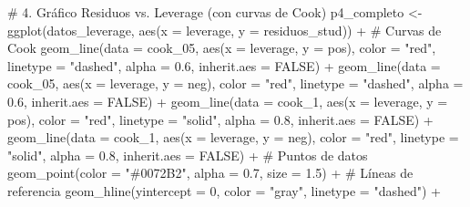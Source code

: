 \documentclass[
  letterpaper,
  DIV=11,
  numbers=noendperiod]{scrreprt}
\newenvironment{Shaded}{\begin{snugshade}}{\end{snugshade}}
\newcommand{\AttributeTok}[1]{\textcolor[rgb]{0.40,0.45,0.13}{#1}}
\newcommand{\CommentTok}[1]{\textcolor[rgb]{0.37,0.37,0.37}{#1}}
\newcommand{\ConstantTok}[1]{\textcolor[rgb]{0.56,0.35,0.01}{#1}}
\newcommand{\DecValTok}[1]{\textcolor[rgb]{0.68,0.00,0.00}{#1}}
\newcommand{\FloatTok}[1]{\textcolor[rgb]{0.68,0.00,0.00}{#1}}
\newcommand{\FunctionTok}[1]{\textcolor[rgb]{0.28,0.35,0.67}{#1}}
\newcommand{\NormalTok}[1]{\textcolor[rgb]{0.00,0.23,0.31}{#1}}
\newcommand{\OtherTok}[1]{\textcolor[rgb]{0.00,0.23,0.31}{#1}}
\newcommand{\SpecialCharTok}[1]{\textcolor[rgb]{0.37,0.37,0.37}{#1}}
\newcommand{\StringTok}[1]{\textcolor[rgb]{0.13,0.47,0.30}{#1}}
\begin{document}
\begin{tcolorbox}
\begin{Shaded}
\begin{Highlighting}[]
\CommentTok{\# 4. Gráfico Residuos vs. Leverage (con curvas de Cook)}
\NormalTok{p4\_completo }\OtherTok{\textless{}{-}} \FunctionTok{ggplot}\NormalTok{(datos\_leverage, }\FunctionTok{aes}\NormalTok{(}\AttributeTok{x =}\NormalTok{ leverage, }\AttributeTok{y =}\NormalTok{ residuos\_stud)) }\SpecialCharTok{+}
  \CommentTok{\# Curvas de Cook}
  \FunctionTok{geom\_line}\NormalTok{(}\AttributeTok{data =}\NormalTok{ cook\_05, }\FunctionTok{aes}\NormalTok{(}\AttributeTok{x =}\NormalTok{ leverage, }\AttributeTok{y =}\NormalTok{ pos), }
            \AttributeTok{color =} \StringTok{"red"}\NormalTok{, }\AttributeTok{linetype =} \StringTok{"dashed"}\NormalTok{, }\AttributeTok{alpha =} \FloatTok{0.6}\NormalTok{, }\AttributeTok{inherit.aes =} \ConstantTok{FALSE}\NormalTok{) }\SpecialCharTok{+}
  \FunctionTok{geom\_line}\NormalTok{(}\AttributeTok{data =}\NormalTok{ cook\_05, }\FunctionTok{aes}\NormalTok{(}\AttributeTok{x =}\NormalTok{ leverage, }\AttributeTok{y =}\NormalTok{ neg), }
            \AttributeTok{color =} \StringTok{"red"}\NormalTok{, }\AttributeTok{linetype =} \StringTok{"dashed"}\NormalTok{, }\AttributeTok{alpha =} \FloatTok{0.6}\NormalTok{, }\AttributeTok{inherit.aes =} \ConstantTok{FALSE}\NormalTok{) }\SpecialCharTok{+}
  \FunctionTok{geom\_line}\NormalTok{(}\AttributeTok{data =}\NormalTok{ cook\_1, }\FunctionTok{aes}\NormalTok{(}\AttributeTok{x =}\NormalTok{ leverage, }\AttributeTok{y =}\NormalTok{ pos), }
            \AttributeTok{color =} \StringTok{"red"}\NormalTok{, }\AttributeTok{linetype =} \StringTok{"solid"}\NormalTok{, }\AttributeTok{alpha =} \FloatTok{0.8}\NormalTok{, }\AttributeTok{inherit.aes =} \ConstantTok{FALSE}\NormalTok{) }\SpecialCharTok{+}
  \FunctionTok{geom\_line}\NormalTok{(}\AttributeTok{data =}\NormalTok{ cook\_1, }\FunctionTok{aes}\NormalTok{(}\AttributeTok{x =}\NormalTok{ leverage, }\AttributeTok{y =}\NormalTok{ neg), }
            \AttributeTok{color =} \StringTok{"red"}\NormalTok{, }\AttributeTok{linetype =} \StringTok{"solid"}\NormalTok{, }\AttributeTok{alpha =} \FloatTok{0.8}\NormalTok{, }\AttributeTok{inherit.aes =} \ConstantTok{FALSE}\NormalTok{) }\SpecialCharTok{+}
  \CommentTok{\# Puntos de datos}
  \FunctionTok{geom\_point}\NormalTok{(}\AttributeTok{color =} \StringTok{"\#0072B2"}\NormalTok{, }\AttributeTok{alpha =} \FloatTok{0.7}\NormalTok{, }\AttributeTok{size =} \FloatTok{1.5}\NormalTok{) }\SpecialCharTok{+}
  \CommentTok{\# Líneas de referencia}
  \FunctionTok{geom\_hline}\NormalTok{(}\AttributeTok{yintercept =} \DecValTok{0}\NormalTok{, }\AttributeTok{color =} \StringTok{"gray"}\NormalTok{, }\AttributeTok{linetype =} \StringTok{"dashed"}\NormalTok{) }\SpecialCharTok{+}

\end{Highlighting}
\end{Shaded}
\end{tcolorbox}
\end{document}
